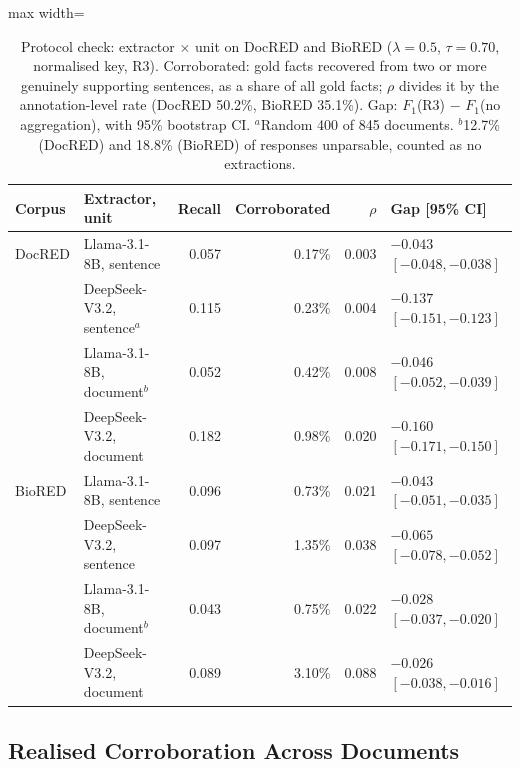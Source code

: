 \documentclass[preprint,12pt,authoryear]{elsarticle}
\begin{document}
\begin{table}[htbp]
\centering
\caption{Protocol check: extractor $\times$ unit on DocRED and BioRED
($\lambda=0.5$, $\tau=0.70$, normalised key, R3). Corroborated: gold
facts recovered from two or more genuinely supporting sentences, as a
share of all gold facts; $\rho$ divides it by the annotation-level rate
(DocRED 50.2\%, BioRED 35.1\%). Gap: $F_1$(R3) $-$ $F_1$(no
aggregation), with 95\% bootstrap CI. $^{a}$Random 400 of 845 documents.
$^{b}$12.7\% (DocRED) and 18.8\% (BioRED) of responses unparsable,
counted as no extractions.}
\label{tab:protocol-results}
\setlength{\tabcolsep}{4pt}
\begin{adjustbox}{max width=\textwidth}
\begin{tabular}{@{}llrrrl@{}}
\toprule
Corpus & Extractor, unit & Recall & Corroborated & $\rho$ & Gap [95\% CI] \\
\midrule
DocRED & Llama-3.1-8B, sentence & 0.057 & 0.17\% & 0.003 & $-0.043$ $[-0.048, -0.038]$ \\
 & DeepSeek-V3.2, sentence$^{a}$ & 0.115 & 0.23\% & 0.004 & $-0.137$ $[-0.151, -0.123]$ \\
 & Llama-3.1-8B, document$^{b}$ & 0.052 & 0.42\% & 0.008 & $-0.046$ $[-0.052, -0.039]$ \\
 & DeepSeek-V3.2, document & 0.182 & 0.98\% & 0.020 & $-0.160$ $[-0.171, -0.150]$ \\
BioRED & Llama-3.1-8B, sentence & 0.096 & 0.73\% & 0.021 & $-0.043$ $[-0.051, -0.035]$ \\
 & DeepSeek-V3.2, sentence & 0.097 & 1.35\% & 0.038 & $-0.065$ $[-0.078, -0.052]$ \\
 & Llama-3.1-8B, document$^{b}$ & 0.043 & 0.75\% & 0.022 & $-0.028$ $[-0.037, -0.020]$ \\
 & DeepSeek-V3.2, document & 0.089 & 3.10\% & 0.088 & $-0.026$ $[-0.038, -0.016]$ \\
\bottomrule
\end{tabular}
\end{adjustbox}
\end{table}

\subsection{Realised Corroboration Across Documents}
\label{sec:results-crossdoc}
\end{document}
